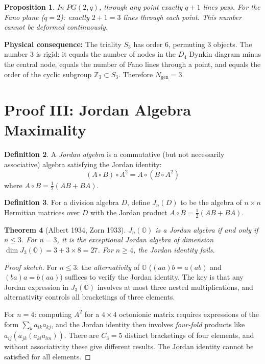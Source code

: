 \documentclass[12pt,a4paper]{article}
\newtheorem{theorem}{Theorem}
\newtheorem{proposition}[theorem]{Proposition}
\theoremstyle{definition}
\newtheorem{definition}[theorem]{Definition}
\theoremstyle{remark}
\newcommand{\Oct}{\mathbb{O}}
\begin{document}
\begin{proposition}
\label{prop:fano}
In $PG(2,q)$, through any point exactly $q+1$ lines pass. For the Fano plane 
($q=2$): exactly $2+1 = 3$ lines through each point. This number cannot be 
deformed continuously.
\end{proposition}

\textbf{Physical consequence:} The triality $S_3$ has order 6, permuting 3 
objects. The number 3 is rigid: it equals the number of nodes in the $D_4$ 
Dynkin diagram minus the central node, equals the number of Fano lines through 
a point, and equals the order of the cyclic subgroup $\mathbb{Z}_3 \subset S_3$. 
Therefore $N_{\mathrm{gen}} = 3$.

\section{Proof III: Jordan Algebra Maximality}
\label{sec:jordan}

\begin{definition}
A \emph{Jordan algebra} is a commutative (but not necessarily associative) algebra 
satisfying the Jordan identity:
\begin{equation}
(A \circ B) \circ A^2 = A \circ (B \circ A^2)
\end{equation}
where $A \circ B = \frac{1}{2}(AB + BA)$.
\end{definition}

\begin{definition}
For a division algebra $D$, define $J_n(D)$ to be the algebra of $n \times n$ 
Hermitian matrices over $D$ with the Jordan product $A \circ B = \frac{1}{2}(AB + BA)$.
\end{definition}

\begin{theorem}[Albert 1934, Zorn 1933]
\label{thm:albert}
$J_n(\Oct)$ is a Jordan algebra if and only if $n \leq 3$. For $n = 3$, it is 
the exceptional Jordan algebra of dimension $\dim J_3(\Oct) = 3 + 3 \times 8 = 27$. 
For $n \geq 4$, the Jordan identity fails.
\end{theorem}

\begin{proof}[Proof sketch]
For $n \leq 3$: the \emph{alternativity} of $\Oct$ 
($(aa)b = a(ab)$ and $(ba)a = b(aa)$) suffices to verify the Jordan identity. 
The key is that any Jordan expression in $J_3(\Oct)$ involves at most 
three nested multiplications, and alternativity controls all bracketings of 
three elements.

For $n = 4$: computing $A^2$ for a $4 \times 4$ octonionic matrix requires 
expressions of the form $\sum_k a_{ik} a_{kj}$, and the Jordan identity then 
involves \emph{four-fold} products like $a_{ij}(a_{jk}(a_{kl} a_{lm}))$. 
There are $C_3 = 5$ distinct bracketings of four elements, and without 
associativity these give different results. The Jordan identity cannot be 
satisfied for all elements.
\end{proof}
\end{document}
